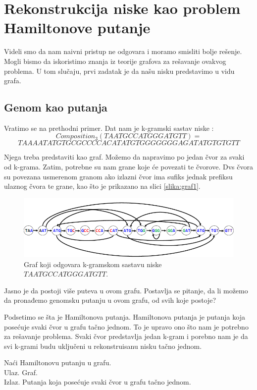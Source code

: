 \section{Rekonstrukcija niske kao problem Hamiltonove putanje}

Videli smo da nam naivni pristup ne odgovara i moramo smisliti bolje rešenje. Mogli bismo da iskoristimo znanja iz teorije grafova za rešavanje ovakvog problema. U tom slučaju, prvi zadatak je da našu nisku predstavimo u vidu grafa.


\subsection{Genom kao putanja}

Vratimo se na prethodni primer. Dat nam je k-gramski sastav niske :
$$Composition_3(TAATGCCATGGGATGTT) =$$
$$ TAA AAT ATG TGC GCC CCA CAT ATG TGG GGG GGA GAT ATG TGT GTT$$

Njega treba predstaviti kao graf. Možemo da napravimo po jedan čvor za svaki od k-grama. Zatim, potrebne su nam grane koje će povezati te čvorove. Dvs čvora su povezana usmerenom granom ako izlazni čvor ima sufiks jednak prefiksu ulaznog čvora te grane, kao što je prikazano na slici \ref{slika:graf1}.

\begin{figure}[H]
	\centering
	\includegraphics[width=1\textwidth]{poglavlja/3/slike/hamilton.png}
	\caption{Graf koji odgovara k-gramskom sastavu niske $TAATGCCATGGGATGTT$.}
	\label{slika:hamilton}
\end{figure} 

Jasno je da postoji više puteva u ovom grafu. Postavlja se pitanje, da li možemo da pronađemo genomsku putanju u ovom grafu, od svih koje postoje?

Podsetimo se šta je Hamiltonova putanja. Hamiltonova putanja je putanja koja posećuje svaki čvor u grafu tačno jednom. To je upravo ono što nam je potrebno za rešavanje problema. Svaki čvor predstavlja jedan k-gram i porebno nam je da svi k-grami budu uključeni u rekonstruisanu nisku tačno jednom.

\begin{problem}
	Naći Hamiltonovu putanju u grafu.
	\\ Ulaz. Graf.
	\\Izlaz. Putanja koja posećuje svaki čvor u grafu tačno jednom.
\end{problem}

